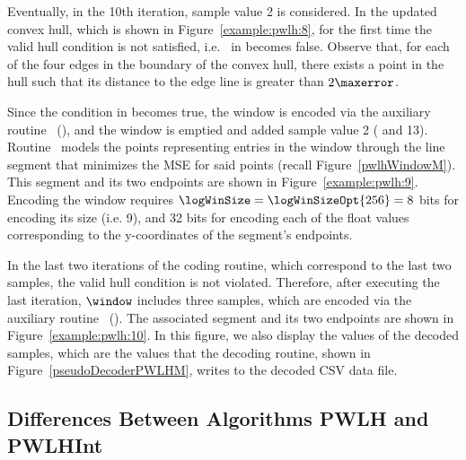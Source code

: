 \clearpage


Eventually, in the 10th iteration, sample value 2 is considered. In the updated convex hull, which is shown in Figure~\ref{example:pwlh:8}, for the first time the valid hull condition is not satisfied, i.e. \validHull\ in  becomes false. Observe that, for each of the four edges in the boundary of the convex hull, there exists a point in the hull such that its distance to the edge line is greater than $2\maxerror$. 


\vspace{+5pt}


Since the condition in  becomes true, the window is encoded via the auxiliary routine \EncodeWindow\ (), and the window is emptied and added sample value 2 ( and 13). Routine \EncodeWindow\ models the points representing entries in the window through the line segment that minimizes the MSE for said points (recall Figure~\ref{pwlhWindowM}). This segment and its two endpoints are shown in Figure~\ref{example:pwlh:9}. Encoding the window requires $\logWinSize = \logWinSizeOpt{256}=8$ bits for encoding its size (i.e. 9), and 32 bits for encoding each of the float values corresponding to the y-coordinates of the segment's endpoints.


\vspace{+5pt}


\clearpage


In the last two iterations of the coding routine, which correspond to the last two samples, the valid hull condition is not violated. Therefore, after executing the last iteration, $\window$ includes three samples, which are encoded via the auxiliary routine \EncodeLastWindowPWLH\ (). The associated segment and its two endpoints are shown in Figure~\ref{example:pwlh:10}. In this figure, we also display the values of the decoded samples, which are the values that the decoding routine, shown in Figure~\ref{pseudoDecoderPWLHM}, writes to the decoded CSV data file. 






\subsection{Differences Between Algorithms PWLH and PWLHInt}
\label{algo:pwhl:int}


